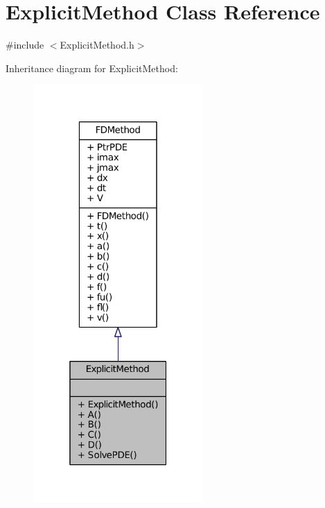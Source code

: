 \hypertarget{classExplicitMethod}{\section{Explicit\+Method Class Reference}
\label{classExplicitMethod}
}


{\ttfamily \#include $<$Explicit\+Method.\+h$>$}



Inheritance diagram for Explicit\+Method\+:\nopagebreak
\begin{figure}[H]
\begin{center}
\leavevmode
\includegraphics[width=184pt]{classExplicitMethod__inherit__graph}
\end{center}
\end{figure}


